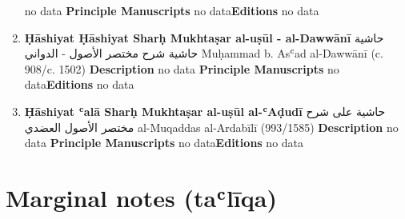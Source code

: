 \documentclass{article}
\begin{document}
\begin{enumerate}
        no data
        \newline
        \newline
    \textbf{Principle Manuscripts}
\newline
no data\newline\textbf{Editions}
\newline
no data\newline
      \item \textbf{Ḥāshiyat Ḥāshiyat Sharḥ Mukhtaṣar al-uṣūl - al-Dawwānī}
        \newline
        \textarabic{حاشية حاشية شرح مختصر الأصول - الدواني}
        \newline
        Muḥammad b. Asʿad al-Dawwānī
        \newline
        (c. 908/c. 1502)
        \newline
        \newline
        \textbf{Description}
        \newline	
        no data
        \newline
        \newline
    \textbf{Principle Manuscripts}
\newline
no data\newline\textbf{Editions}
\newline
no data\newline
      \item \textbf{Ḥāshiyat ʿalā Sharḥ Mukhtaṣar al-uṣūl al-ʿAḍudī}
        \newline
        \textarabic{حاشية على شرح مختصر الأصول العضدي}
        \newline
        al-Muqaddas al-Ardabīlī
        \newline
        (993/1585)
        \newline
        \newline
        \textbf{Description}
        \newline	
        no data
        \newline
        \newline
    \textbf{Principle Manuscripts}
\newline
no data\newline\textbf{Editions}
\newline
no data\newline\end{enumerate}\section{Marginal notes (taʿlīqa)}
\end{document}
